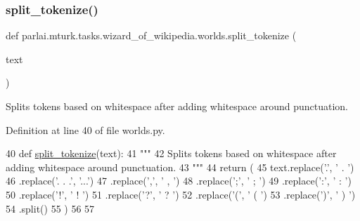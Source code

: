 \subsubsection{\texorpdfstring{split\+\_\+tokenize()}{split\_tokenize()}}
{\footnotesize\ttfamily def parlai.\+mturk.\+tasks.\+wizard\+\_\+of\+\_\+wikipedia.\+worlds.\+split\+\_\+tokenize (\begin{DoxyParamCaption}\item[{}]{text }\end{DoxyParamCaption})}

\begin{DoxyVerb}Splits tokens based on whitespace after adding whitespace around punctuation.
\end{DoxyVerb}
 

Definition at line 40 of file worlds.\+py.


\begin{DoxyCode}
40 \textcolor{keyword}{def }\hyperlink{namespaceparlai_1_1mturk_1_1tasks_1_1wizard__of__wikipedia_1_1worlds_a040aaf5ecfbddec14f321279454f85a8}{split\_tokenize}(text):
41     \textcolor{stringliteral}{"""}
42 \textcolor{stringliteral}{    Splits tokens based on whitespace after adding whitespace around punctuation.}
43 \textcolor{stringliteral}{    """}
44     \textcolor{keywordflow}{return} (
45         text.replace(\textcolor{stringliteral}{'.'}, \textcolor{stringliteral}{' . '})
46         .replace(\textcolor{stringliteral}{'. . .'}, \textcolor{stringliteral}{'...'})
47         .replace(\textcolor{stringliteral}{','}, \textcolor{stringliteral}{' , '})
48         .replace(\textcolor{stringliteral}{';'}, \textcolor{stringliteral}{' ; '})
49         .replace(\textcolor{stringliteral}{':'}, \textcolor{stringliteral}{' : '})
50         .replace(\textcolor{stringliteral}{'!'}, \textcolor{stringliteral}{' ! '})
51         .replace(\textcolor{stringliteral}{'?'}, \textcolor{stringliteral}{' ? '})
52         .replace(\textcolor{stringliteral}{'('}, \textcolor{stringliteral}{' ( '})
53         .replace(\textcolor{stringliteral}{')'}, \textcolor{stringliteral}{' ) '})
54         .split()
55     )
56 
57 
\end{DoxyCode}
